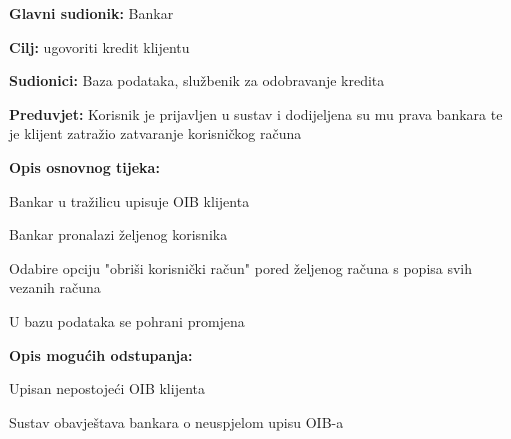            	\noindent {}
            	\begin{packed_item}
            		
            		\item \textbf{Glavni sudionik: }Bankar
            		\item  \textbf{Cilj:} ugovoriti kredit klijentu
            		\item  \textbf{Sudionici:} Baza podataka, službenik za odobravanje kredita
            		\item  \textbf{Preduvjet:} Korisnik je prijavljen u sustav i dodijeljena su mu prava bankara te je klijent zatražio zatvaranje korisničkog računa
            		\item  \textbf{Opis osnovnog tijeka:}
            		
            		\item[] \begin{packed_enum}
            			
            			\item Bankar u tražilicu upisuje OIB klijenta
            			\item Bankar pronalazi željenog korisnika
            			\item Odabire opciju "obriši korisnički račun" pored željenog računa s popisa svih vezanih računa
            			\item U bazu podataka se pohrani promjena
            		\end{packed_enum}
            		
            		\item  \textbf{Opis mogućih odstupanja:} 
            		
            		\item[] \begin{packed_item}
            			
            			\item[1.a] Upisan nepostojeći OIB klijenta
            			\item[] \begin{packed_enum}
            				
            				\item Sustav obavještava bankara o neuspjelom upisu OIB-a
            				
            			\end{packed_enum}
            			
            		\end{packed_item}
            	\end{packed_item}            
            
